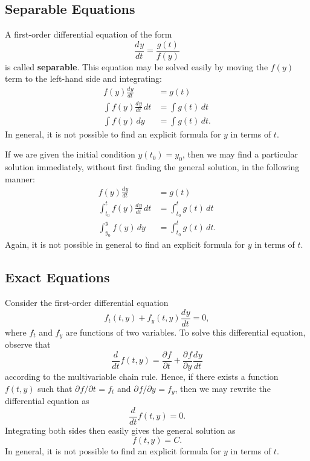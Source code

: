 \documentclass{myart}
\newcommand{\term}[1]{\textbf{#1}}
\newcommand{\deriv}[3][]{\frac{d^{#1}#2}{d#3^{#1}}}
\newcommand{\pderiv}[3][]{\frac{\partial^{#1}#2}{\partial#3^{#1}}}
\newcommand{\fpderiv}[3][]{\partial^{#1}#2/\partial#3^{#1}}
\begin{document}
\subsection{Separable Equations}
\label{subsec:separable}

A first-order differential equation of the form
\begin{equation*}
  \deriv{y}{t} = \frac{g(t)}{f(y)}
\end{equation*}
is called \term{separable}. This equation may be solved easily by
moving the $f(y)$ term to the left-hand side and integrating:
\begin{align*}
  f(y) \deriv{y}{t} &= g(t) \\
  \int f(y) \deriv{y}{t} \,dt &= \int g(t) \,dt \\
  \int f(y) \,dy &= \int g(t) \,dt.
\end{align*}
In general, it is not possible to find an explicit formula for $y$ in
terms of $t$.

If we are given the initial condition $y(t_0) = y_0$, then we may find
a particular solution immediately, without first finding the general
solution, in the following manner:
\begin{align*}
  f(y) \deriv{y}{t} &= g(t) \\
  \int_{t_0}^t f(y) \deriv{y}{t} \,dt &= \int_{t_0}^t g(t) \,dt \\
  \int_{y_0}^y f(y) \,dy &= \int_{t_0}^t g(t) \,dt.
\end{align*}
Again, it is not possible in general to find an explicit formula for
$y$ in terms of $t$.

\subsection{Exact Equations}
\label{subsec:exact}

Consider the first-order differential equation
\begin{equation*}
  f_t(t, y) + f_y(t, y) \deriv{y}{t} = 0,
\end{equation*}
where $f_t$ and $f_y$ are functions of two variables. To solve this
differential equation, observe that
\begin{equation*}
  \deriv{}{t} f(t, y) = \pderiv{f}{t} + \pderiv{f}{y} \deriv{y}{t}
\end{equation*}
according to the multivariable chain rule. Hence, if there exists a
function $f(t, y)$ such that $\fpderiv{f}{t} = f_t$ and
$\fpderiv{f}{y} = f_y$, then we may rewrite the differential equation
as
\begin{equation*}
  \deriv{}{t} f(t, y) = 0.
\end{equation*}
Integrating both sides then easily gives the general solution as
\begin{equation*}
  f(t, y) = C.
\end{equation*}
In general, it is not possible to find an explicit formula for $y$ in
terms of $t$.
\end{document}
